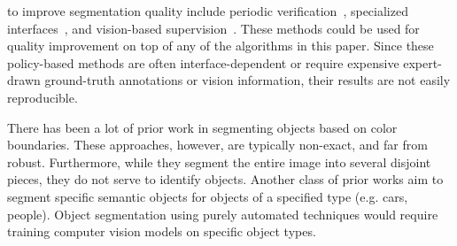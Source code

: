  to improve segmentation quality include periodic verification~\cite{Lin2014,Everingham15}, specialized interfaces~\cite{Song2018}, and vision-based supervision~\cite{Russakovsky2015,Gurari2016}. These methods could be used for quality improvement on top of any of the algorithms in this paper.  Since these policy-based methods are often interface-dependent or require expensive expert-drawn ground-truth annotations or vision information, their results are not easily reproducible. %

 There has been a lot of prior work in segmenting objects based on color boundaries\cite{felzenszwalb2004efficient,Y.Y.Boykov2001}. These approaches, however, are typically non-exact, and far from robust. Furthermore, while they segment the entire image into several disjoint pieces, they do not serve to identify objects. Another class of prior works aim to segment specific semantic objects for objects of a specified type (e.g. cars, people)\cite{AdrianaKovashka2016,Lin2014,zhou2017scene}. Object segmentation using purely automated techniques would require training computer vision models on specific object types. 